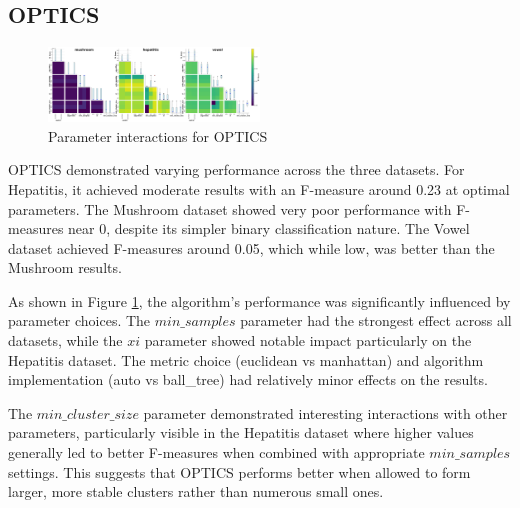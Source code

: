 \subsection{OPTICS}
\label{subsec:opticsresults}

\begin{figure}[ht!]
    \includegraphics[width=0.5\textwidth]{figures/interactions_optics.png}
    \caption{Parameter interactions for OPTICS}
    \label{fig:interactions_optics}
    \end{figure}

OPTICS demonstrated varying performance across the three datasets. For Hepatitis, it achieved moderate results with an F-measure around 0.23 at optimal parameters. The Mushroom dataset showed very poor performance with F-measures near 0, despite its simpler binary classification nature. The Vowel dataset achieved F-measures around 0.05, which while low, was better than the Mushroom results.

As shown in Figure \ref{fig:interactions_optics}, the algorithm's performance was significantly influenced by parameter choices. The $min\_samples$ parameter had the strongest effect across all datasets, while the $xi$ parameter showed notable impact particularly on the Hepatitis dataset. The metric choice (euclidean vs manhattan) and algorithm implementation (auto vs ball\_tree) had relatively minor effects on the results.

The $min\_cluster\_size$ parameter demonstrated interesting interactions with other parameters, particularly visible in the Hepatitis dataset where higher values generally led to better F-measures when combined with appropriate $min\_samples$ settings. This suggests that OPTICS performs better when allowed to form larger, more stable clusters rather than numerous small ones.

